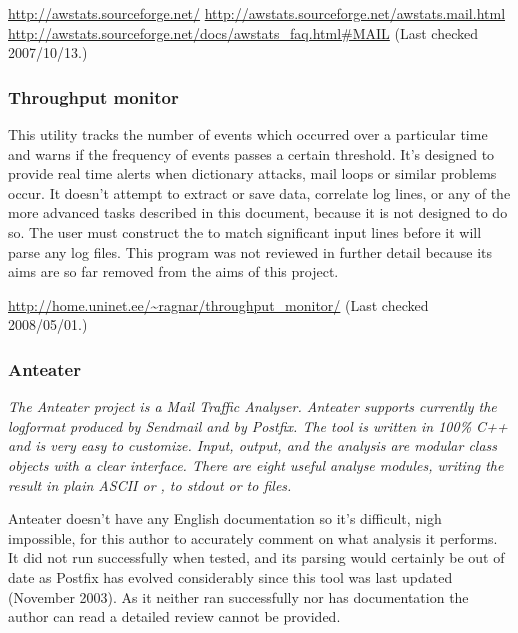 
\noindent\url{http://awstats.sourceforge.net/} \newline
\url{http://awstats.sourceforge.net/awstats.mail.html} \newline
\url{http://awstats.sourceforge.net/docs/awstats_faq.html#MAIL}
\newline (Last checked 2007/10/13.)

\subsubsection{Throughput monitor}

This utility tracks the number of events which occurred over a particular
time and warns if the frequency of events passes a certain threshold.  It's
designed to provide real time alerts when dictionary attacks, mail loops or
similar problems occur. It doesn't attempt to extract or save data,
correlate log lines, or any of the more advanced tasks described in this
document, because it is not designed to do so.  The user must construct the
\regexes{} to match significant input lines before it will parse any log
files.  This program was not reviewed in further detail because its aims
are so far removed from the aims of this project.

\url{http://home.uninet.ee/~ragnar/throughput_monitor/} \newline (Last
checked 2008/05/01.)

\subsubsection{Anteater}

\textit{The Anteater project is a Mail Traffic Analyser. Anteater supports
currently the logformat produced by Sendmail and by Postfix. The tool is
written in 100\% C++ and is very easy to customize. Input, output, and the
analysis are modular class objects with a clear interface. There are eight
useful analyse modules, writing the result in plain ASCII or \HTML{}, to
stdout or to files.\/}

Anteater doesn't have any English documentation so it's difficult, nigh
impossible, for this author to accurately comment on what analysis it
performs.  It did not run successfully when tested, and its parsing would
certainly be out of date as Postfix has evolved considerably since this
tool was last updated (November 2003).  As it neither ran successfully nor
has documentation the author can read a detailed review cannot be provided.

